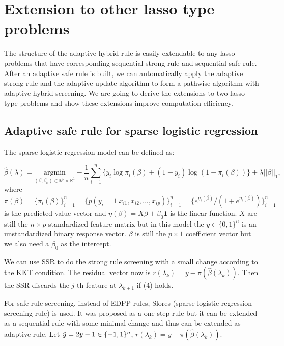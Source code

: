 \section{Extension to other lasso type problems}
\label{sec:4}

The structure of the adaptive hybrid rule is easily extendable to any lasso problems that have corresponding sequential strong rule and sequential safe rule. After an adaptive safe rule is built, we can automatically apply the adaptive strong rule and the adaptive update algorithm to form a pathwise algorithm with adaptive hybrid screening. We are going to derive the extensions to two lasso type problems and show these extensions improve computation efficiency.

\subsection{Adaptive safe rule for sparse logistic regression}

The sparse logistic regression model can be defined as:

\begin{equation}
    \hat{\beta}(\lambda)=\underset{(\beta,\beta_0)\in \mathbb{R}^p\times\mathbb{R}^1}{\mathrm{argmin}}-\frac{1}{n}\sum_{i=1}^n\{y_i\log\pi_i(\beta)+(1-y_i)\log(1-\pi_i(\beta))\}+\lambda||\beta||_1,
\end{equation}
where $\pi(\beta)=\{\pi_i(\beta)\}_{i=1}^n=\{p(y_i=1|x_{i1},x_{i2},...,x_{ip})\}_{i=1}^n=\{e^{\eta_i(\beta)}/(1+e^{\eta_i(\beta)})\}_{i=1}^n$ is the predicted value vector and $\eta(\beta)=X\beta+\beta_0\mathbf{1}$ is the linear function. $X$ are still the $n\times p$ standardized feature matrix but in this model the $y\in\{0,1\}^n$ is an unstandardized binary response vector. $\beta$ is still the $p\times1$ coefficient vector but we also need a $\beta_0$ as the intercept.

We can use SSR to do the strong rule screening with a small change according to the KKT condition. The residual vector now is $r(\lambda_k)=y-\pi(\hat{\beta}(\lambda_k))$. Then the SSR discards the $j$-th feature at $\lambda_{k+1}$ if (4) holds.

For safe rule screening, instead of EDPP rules, Slores (sparse logistic regression screening rule)\citep{wang2014safe} is used. It was proposed as a one-step rule but it can be extended as a sequential rule with some minimal change and thus can be extended as adaptive rule. Let $\Tilde{y}=2y-1\in\{-1,1\}^n$, $r(\lambda_k)=y-\pi(\hat{\beta}(\lambda_k))$.

